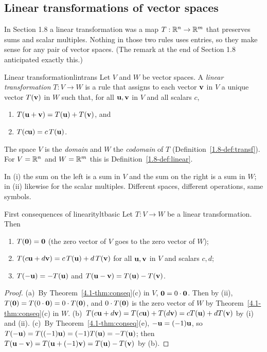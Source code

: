 \documentclass[11pt]{article}
\begin{document}
\subsection*{Linear transformations of vector spaces}

In Section 1.8 a linear transformation was a map $T:\mathbb{R}^n\to\mathbb{R}^m$ that preserves sums and scalar multiples. Nothing in those two rules uses entries, so they make sense for any pair of vector spaces. (The remark at the end of Section 1.8 anticipated exactly this.)

\begin{defn}{Linear transformation}{lintrans}
Let $V$ and $W$ be vector spaces. A \emph{linear transformation} $T:V\to W$ is a rule that assigns to each vector $\mathbf{v}$ in $V$ a unique vector $T(\mathbf{v})$ in $W$ such that, for all $\mathbf{u},\mathbf{v}$ in $V$ and all scalars $c$,
\begin{enumerate}[label=(\roman*),itemsep=1pt]
  \item $T(\mathbf{u}+\mathbf{v})=T(\mathbf{u})+T(\mathbf{v})$, and
  \item $T(c\mathbf{u})=c\,T(\mathbf{u})$.
\end{enumerate}
The space $V$ is the \emph{domain} and $W$ the \emph{codomain} of $T$ (Definition~\ref{1.8-def:transf}). For $V=\mathbb{R}^n$ and $W=\mathbb{R}^m$ this is Definition~\ref{1.8-def:linear}.
\end{defn}

In (i) the sum on the left is a sum in $V$ and the sum on the right is a sum in $W$; in (ii) likewise for the scalar multiples. Different spaces, different operations, same symbols.

\begin{thm}{First consequences of linearity}{ltbasic}
Let $T:V\to W$ be a linear transformation. Then
\begin{enumerate}[label=(\alph*),itemsep=1pt]
  \item $T(\mathbf{0})=\mathbf{0}$ (the zero vector of $V$ goes to the zero vector of $W$);
  \item $T(c\mathbf{u}+d\mathbf{v})=c\,T(\mathbf{u})+d\,T(\mathbf{v})$ for all $\mathbf{u},\mathbf{v}$ in $V$ and scalars $c,d$;
  \item $T(-\mathbf{u})=-T(\mathbf{u})$ and $T(\mathbf{u}-\mathbf{v})=T(\mathbf{u})-T(\mathbf{v})$.
\end{enumerate}
\end{thm}

\begin{proof}
(a)~By Theorem~\ref{4.1-thm:conseq}(c) in $V$, $\mathbf{0}=0\cdot\mathbf{0}$. Then by (ii), $T(\mathbf{0})=T(0\cdot\mathbf{0})=0\cdot T(\mathbf{0})$, and $0\cdot T(\mathbf{0})$ is the zero vector of $W$ by Theorem~\ref{4.1-thm:conseq}(c) in $W$. (b)~$T(c\mathbf{u}+d\mathbf{v})=T(c\mathbf{u})+T(d\mathbf{v})=cT(\mathbf{u})+dT(\mathbf{v})$ by (i) and (ii). (c)~By Theorem~\ref{4.1-thm:conseq}(e), $-\mathbf{u}=(-1)\mathbf{u}$, so $T(-\mathbf{u})=T((-1)\mathbf{u})=(-1)T(\mathbf{u})=-T(\mathbf{u})$; then $T(\mathbf{u}-\mathbf{v})=T(\mathbf{u}+(-1)\mathbf{v})=T(\mathbf{u})-T(\mathbf{v})$ by (b).
\end{proof}
\end{document}
